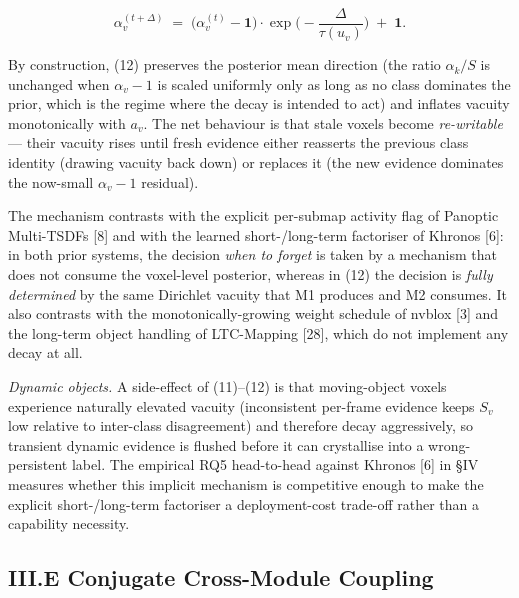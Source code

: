 \documentclass[
]{article}
\begin{document}
\[
\alpha_v^{(t + \Delta)} \;=\; \big( \alpha_v^{(t)} - \mathbf{1} \big) \cdot \exp\!\Big( -\frac{\Delta}{\tau(u_v)} \Big) \;+\; \mathbf{1} . \tag{12}
\]

By construction, (12) preserves the posterior mean direction (the ratio
\(\alpha_k / S\) is unchanged when \(\alpha_v - 1\) is scaled uniformly
only as long as no class dominates the prior, which is the regime where
the decay is intended to act) and inflates vacuity monotonically with
\(a_v\). The net behaviour is that stale voxels become
\emph{re-writable} --- their vacuity rises until fresh evidence either
reasserts the previous class identity (drawing vacuity back down) or
replaces it (the new evidence dominates the now-small \(\alpha_v - 1\)
residual).

The mechanism contrasts with the explicit per-submap activity flag of
Panoptic Multi-TSDFs {[}8{]} and with the learned short-/long-term
factoriser of Khronos {[}6{]}: in both prior systems, the decision
\emph{when to forget} is taken by a mechanism that does not consume the
voxel-level posterior, whereas in (12) the decision is \emph{fully
determined} by the same Dirichlet vacuity that M1 produces and M2
consumes. It also contrasts with the monotonically-growing weight
schedule of nvblox {[}3{]} and the long-term object handling of
LTC-Mapping {[}28{]}, which do not implement any decay at all.

\emph{Dynamic objects.} A side-effect of (11)--(12) is that
moving-object voxels experience naturally elevated vacuity (inconsistent
per-frame evidence keeps \(S_v\) low relative to inter-class
disagreement) and therefore decay aggressively, so transient dynamic
evidence is flushed before it can crystallise into a wrong-persistent
label. The empirical RQ5 head-to-head against Khronos {[}6{]} in §IV
measures whether this implicit mechanism is competitive enough to make
the explicit short-/long-term factoriser a deployment-cost trade-off
rather than a capability necessity.

\subsection{III.E Conjugate Cross-Module
Coupling}\label{iiie-conjugate-cross-module-coupling}
\end{document}
